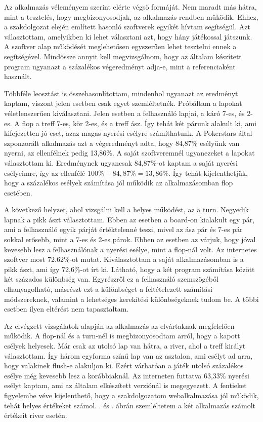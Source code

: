 
Az alkalmazás véleményem szerint elérte végső formáját. Nem maradt más hátra, mint a tesztelés, hogy megbizonyosodjak, az alkalmazás rendben működik. Ehhez, a szakdolgozat elején említett hasonló szoftverek egyikét hívtam segítségül. Azt választottam, amelyikben ki lehet választani azt, hogy hány játékossal játszunk. A szoftver alap működését meglehetősen egyszerűen lehet tesztelni ennek a segítségével. Mindössze annyit kell megvizsgálnom, hogy az általam készített program ugyanazt a százalékos végeredményt adja-e, mint a referenciaként használt.

Többféle leosztást is összehasonlítottam, mindenhol ugyanazt az eredményt kaptam, viszont jelen esetben csak egyet szemléltetnék. Próbáltam a lapokat véletlenszerűen kiválasztani. Jelen esetben a felhasználó lapjai, a káró 7-es, és 2-es. A flop a treff 7-es, kör 2-es, és a treff ász. Így tehát két párunk alakult ki, ami kifejezetten jó eset, azaz magas nyerési esélyre számíthatunk. A Pokerstars által szponzorált alkalmazás azt a végeredményt adta, hogy 84,87\% esélyünk van nyerni, az ellenfélnek pedig 13,86\%. A saját szoftveremnél ugyanezeket a lapokat választottam ki. Eredménynek ugyancsak 84,87\%-ot kaptam a saját nyerési esélyeimre, így az ellenfélé $100\%-84,87\%=13,86\%$. Így tehát kijelenthetjük, hogy a százalékos esélyek számítása jól működik az alkalmazásomban flop esetében.

A következő helyzet, ahol vizsgálni kell a helyes működést, az a turn. Negyedik lapnak a pikk ászt választottam. Ebben az esetben a board-on kialakult egy pár, ami a felhasználó egyik párját értéktelenné teszi, mivel az ász pár és 7-es pár sokkal erősebb, mint a 7-es és 2-es párok. Ebben az esetben az várjuk, hogy jóval kevesebb lesz a felhasználónak a nyerési esélye, mint a flop-nál volt. Az internetes szoftver most 72.62\%-ot mutat. Kiválasztottam a saját alkalmazásomban is a pikk ászt, ami így 72,6\%-ot írt ki. Látható, hogy a két program számítása között két százados különbség van. Egyrészről ez a felhasználó szemszögéből elhanyagolható, másrészt ezt a különbséget a feltételezett számítási módszereknek, valamint a lehetséges kerekítési különbségeknek tudom be. A többi esetben ilyen eltérést nem tapasztaltam.

Az elvégzett vizsgálatok alapján az alkalmazás az elvártaknak megfelelően működik. A flop-nál és a turn-nél is megbizonyosodtam arról, hogy a kapott esélyek helyesek. Már csak az utolsó lap van hátra, a river, ahol a treff királyt választottam. Így három egyforma színű lap van az asztalon, ami esélyt ad arra, hogy valakinek flush-e alakuljon ki. Ezért várhatóan a játék utolsó százalékos esélye még kevesebb lesz a korábbiaknál. Az interneten futtatva 63,33\% nyerési esélyt kaptam, ami az általam elkészített verziónál is megegyezett. A fentieket figyelembe véve kijelenthető, hogy a szakdolgozatom webalkalmazása jól működik, tehát helyes értékeket számol. . és . ábrán szemléltetem a két alkalmazás számolt értékeit river esetén.

